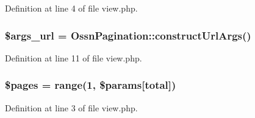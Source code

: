 Definition at line 4 of file view.\+php.

\subsubsection[{\texorpdfstring{\$args\+\_\+url}{$args_url}}]{\setlength{\rightskip}{0pt plus 5cm}\$args\+\_\+url = {\bf Ossn\+Pagination\+::construct\+Url\+Args}()}\hypertarget{themes_2goblue_2plugins_2default_2pagination_2view_8php_aa1f410f2935a06fa254645d417732114}{}\label{themes_2goblue_2plugins_2default_2pagination_2view_8php_aa1f410f2935a06fa254645d417732114}


Definition at line 11 of file view.\+php.

\subsubsection[{\texorpdfstring{\$pages}{$pages}}]{\setlength{\rightskip}{0pt plus 5cm}\$pages = range(1, \$params\mbox{[}\textquotesingle{}total\textquotesingle{}\mbox{]})}\hypertarget{themes_2goblue_2plugins_2default_2pagination_2view_8php_a263621399c53f2952c2329ee13ad8e4e}{}\label{themes_2goblue_2plugins_2default_2pagination_2view_8php_a263621399c53f2952c2329ee13ad8e4e}


Definition at line 3 of file view.\+php.

